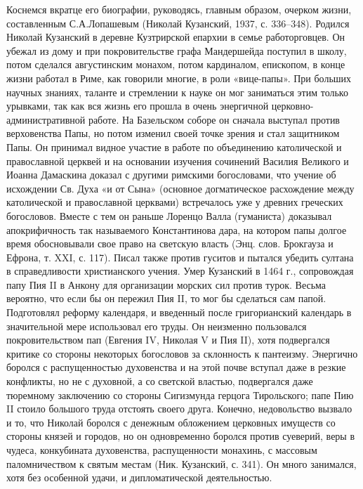 Коснемся вкратце  его биографии, руководясь, главным  образом, очерком
жизни,  составленным   С.А.Лопашевым  (Николай  Кузанский,   1937,  с.
336--348).  Родился Николай  Кузанский в  деревне Кузтрирской  епархии
в  семье  работорговцев.  Он  убежал из  дому  и  при  покровительстве
графа  Мандершейда  поступил  в  школу,  потом  сделался  августинским
монахом,  потом  кардиналом,  епископом,   в  конце  жизни  работал  в
Риме, как  говорили многие,  в роли  «вице-папы». При  больших научных
знаниях,  таланте  и  стремлении  к   науке  он  мог  заниматься  этим
только  урывками, так  как вся  жизнь  его прошла  в очень  энергичной
церковно-административной  работе.  На  Базельском соборе  он  сначала
выступал  против  верховенства  Папы,  но потом  изменил  своей  точке
зрения и  стал защитником  Папы. Он принимал  видное участие  в работе
по  объединению католической  и  православной церквей  и на  основании
изучения  сочинений  Василия Великого  и  Иоанна  Дамаскина доказал  с
другими  римскими  богословами,  что  учение об  исхождении  Св.  Духа
«и  от Сына»  (основное догматическое  расхождение между  католической
и  православной   церквами)  встречалось   уже  у   древних  греческих
богословов. Вместе с тем он раньше Лоренцо Валла (гуманиста) доказывал
апокрифичность  так называемого  Константинова дара,  на котором  папы
долгое время  обосновывали свое право  на светскую власть  (Энц. слов.
Брокгауза  и Ефрона,  т.  XXI,  с. 117).  Писал  также против  гуситов
и  пытался  убедить  султана в  справедливости  христианского  учения.
Умер  Кузанский в  1464  г.,  сопровождая папу  Пия  II  в Анкону  для
организации морских сил против турок.  Весьма вероятно, что если бы он
пережил Пия  II, то  мог бы сделаться  сам папой.  Подготовлял реформу
календаря, и  введенный после  григорианский календарь  в значительной
мере использовал его труды.  Он неизменно пользовался покровительством
пап (Евгения  IV, Николая  V и  Пия II),  хотя подвергался  критике со
стороны  некоторых богословов  за  склонность  к пантеизму.  Энергично
боролся с  распущенностью духовенства и  на этой почве вступал  даже в
резкие конфликты, но не с духовной, а со светской властью, подвергался
даже тюремному  заключению со стороны Сигизмунда  герцога Тирольского;
папе  Пию II  стоило большого  труда отстоять  своего друга.  Конечно,
недовольство вызвало и  то, что Николай боролся  с денежным обложением
церковных имуществ  со стороны  князей и  городов, но  он одновременно
боролся  против  суеверий,  веры в  чудеса,  конкубината  духовенства,
распущенности  монахинь, с  массовым  паломничеством  к святым  местам
(Ник.  Кузанский, с.  341).  Он много  занимался,  хотя без  особенной
удачи, и дипломатической деятельностью.

